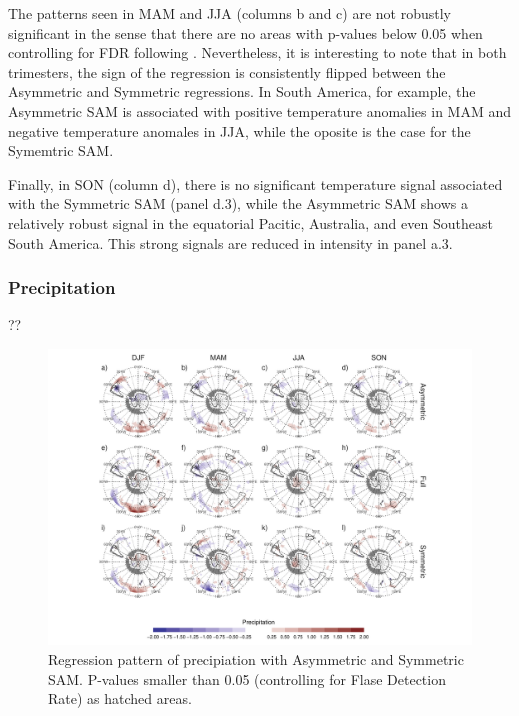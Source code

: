 \documentclass[]{ametsocV5}
\begin{document}
The patterns seen in MAM and JJA (columns b and c) are not robustly
significant in the sense that there are no areas with p-values below
0.05 when controlling for FDR following \citet{wilks2016}. Nevertheless,
it is interesting to note that in both trimesters, the sign of the
regression is consistently flipped between the Asymmetric and Symmetric
regressions. In South America, for example, the Asymmetric SAM is
associated with positive temperature anomalies in MAM and negative
temperature anomales in JJA, while the oposite is the case for the
Symemtric SAM.

Finally, in SON (column d), there is no significant temperature signal
associated with the Symmetric SAM (panel d.3), while the Asymmetric SAM
shows a relatively robust signal in the equatorial Pacitic, Australia,
and even Southeast South America. This strong signals are reduced in
intensity in panel a.3.

\subsubsection{Precipitation}

??

\begin{figure}
\includegraphics{pp-regr-global-1} \caption[Regression pattern of precipiation with Asymmetric and Symmetric SAM]{Regression pattern of precipiation with Asymmetric and Symmetric SAM. P-values smaller than 0.05 (controlling for Flase Detection Rate) as hatched areas.}\label{fig:pp-regr-global}
\end{figure}

\acknowledgments
\end{document}
